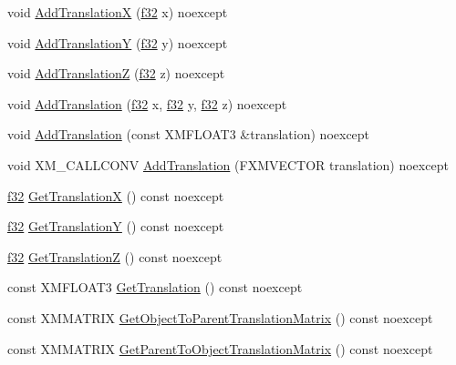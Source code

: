 \begin{DoxyCompactItemize}
\item 
void \hyperlink{structmage_1_1_transform_node_aa6b2b108ebb521034c095ba1ffa05e09}{Add\+TranslationX} (\hyperlink{namespacemage_a6a44ad388483959dc4dff9f2aef91431}{f32} x) noexcept
\item 
void \hyperlink{structmage_1_1_transform_node_a1f2102bd9c7027db8315c21e3bbb0eac}{Add\+TranslationY} (\hyperlink{namespacemage_a6a44ad388483959dc4dff9f2aef91431}{f32} y) noexcept
\item 
void \hyperlink{structmage_1_1_transform_node_ad5d37bad6186ff7fd6f014a7d4597f80}{Add\+TranslationZ} (\hyperlink{namespacemage_a6a44ad388483959dc4dff9f2aef91431}{f32} z) noexcept
\item 
void \hyperlink{structmage_1_1_transform_node_a259622ca48584c04b665a0956f644276}{Add\+Translation} (\hyperlink{namespacemage_a6a44ad388483959dc4dff9f2aef91431}{f32} x, \hyperlink{namespacemage_a6a44ad388483959dc4dff9f2aef91431}{f32} y, \hyperlink{namespacemage_a6a44ad388483959dc4dff9f2aef91431}{f32} z) noexcept
\item 
void \hyperlink{structmage_1_1_transform_node_a8310335915abb6583bbae4aa2a0e3b20}{Add\+Translation} (const X\+M\+F\+L\+O\+A\+T3 \&translation) noexcept
\item 
void X\+M\+\_\+\+C\+A\+L\+L\+C\+O\+NV \hyperlink{structmage_1_1_transform_node_aa1241519dfcb8179d4564847e20c1c2c}{Add\+Translation} (F\+X\+M\+V\+E\+C\+T\+OR translation) noexcept
\item 
\hyperlink{namespacemage_a6a44ad388483959dc4dff9f2aef91431}{f32} \hyperlink{structmage_1_1_transform_node_a83e22370c12c07387c3383f317025823}{Get\+TranslationX} () const noexcept
\item 
\hyperlink{namespacemage_a6a44ad388483959dc4dff9f2aef91431}{f32} \hyperlink{structmage_1_1_transform_node_a637db0813401911ca6f0918a8219b666}{Get\+TranslationY} () const noexcept
\item 
\hyperlink{namespacemage_a6a44ad388483959dc4dff9f2aef91431}{f32} \hyperlink{structmage_1_1_transform_node_a4975ec866f709857f6aa980c956ec627}{Get\+TranslationZ} () const noexcept
\item 
const X\+M\+F\+L\+O\+A\+T3 \hyperlink{structmage_1_1_transform_node_a98da5fb59f03d37a615a9846e5f5e926}{Get\+Translation} () const noexcept
\item 
const X\+M\+M\+A\+T\+R\+IX \hyperlink{structmage_1_1_transform_node_a32c025e3ded200decae648f7e249dfe2}{Get\+Object\+To\+Parent\+Translation\+Matrix} () const noexcept
\item 
const X\+M\+M\+A\+T\+R\+IX \hyperlink{structmage_1_1_transform_node_a11feea92825b1b537940cd8105edd801}{Get\+Parent\+To\+Object\+Translation\+Matrix} () const noexcept

\end{DoxyCompactItemize}
